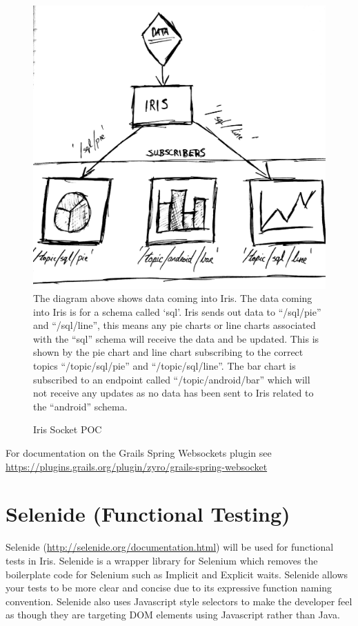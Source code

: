 \documentclass[12pt,a4paper,titlepage]{report}
\newcommand{\q}[1]{``#1''}
\begin{document}
\begin{figure}[H]
\begin{tcolorbox}
\includegraphics[width=\textwidth,height=\textheight,keepaspectratio]{iris_sockets}
\newline
The diagram above shows data coming into Iris. The data coming into Iris is for a schema called ‘sql’. Iris sends out data to \q{/sql/pie} and \q{/sql/line}, this means any pie charts or line charts associated with the \q{sql} schema will receive the data and be updated. This is shown by the pie chart and line chart subscribing to the correct topics \q{/topic/sql/pie} and \q{/topic/sql/line}. The bar chart is subscribed to an endpoint called \q{/topic/android/bar} which will not receive any updates as no data has been sent to Iris related to the \q{android} schema.
\end{tcolorbox}
\caption{Iris Socket POC}
\end{figure}
For documentation on the Grails Spring Websockets plugin see \url{https://plugins.grails.org/plugin/zyro/grails-spring-websocket}

\section{Selenide (Functional Testing)}
Selenide (\url{http://selenide.org/documentation.html}) will be used for functional tests in Iris. Selenide is a wrapper library for Selenium which removes the boilerplate code for Selenium such as Implicit and Explicit waits. Selenide allows your tests to be more clear and concise due to its expressive function naming convention. Selenide also uses Javascript style selectors to make the developer feel as though they are targeting DOM elements using Javascript rather than Java.
\end{document}
